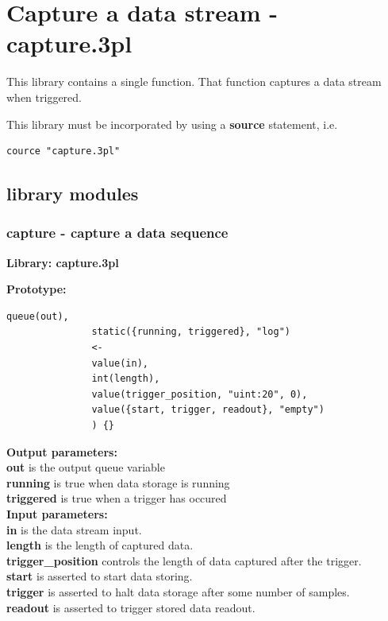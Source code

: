 \pagebreak

\section{Capture a data stream - capture.3pl}\label{chap:capture}

    This library contains a single function. That function captures a
    data stream when triggered.
    
    This library must be incorporated by using a {\bf source} statement, i.e.
    \begin{lstlisting}[gobble=4, language=threepl]
       cource "capture.3pl"
    \end{lstlisting}



    \subsection{library modules}
    
    
        \subsubsection{capture - capture a data sequence}\label{sec:lmcapture}

            {\bf Library: capture.3pl}


            {\bf Prototype:} \\
            \vsp
            \begin{lstlisting}[gobble=12, language=threepl]
               queue(out),
               static({running, triggered}, "log")
               <-
               value(in),
               int(length),
               value(trigger_position, "uint:20", 0),
               value({start, trigger, readout}, "empty")
               ) {}
            \end{lstlisting}

            {\bf Output parameters:} \\
            {\bf out} is the output queue variable\\
            {\bf running} is true when data storage is running\\
            {\bf triggered} is true when a trigger has occured\\

            {\bf Input parameters:} \\
            {\bf in} is the data stream input.\\
            {\bf length} is the length of captured data.\\
            {\bf trigger\_position} controls the length of data captured
            after the trigger.\\
            {\bf start} is asserted to start data storing.\\
            {\bf trigger} is asserted to halt data storage after
            some number of samples.\\
            {\bf readout} is asserted to trigger stored data readout.\\

